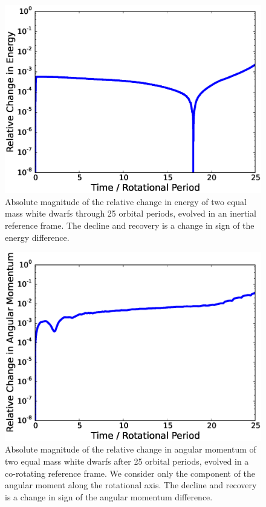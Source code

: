\documentclass[iop]{../emulateapj}
\begin{document}
\begin{figure}
  \centering
  \includegraphics[scale=0.45]{plots/equal_energy_rot0.eps}
  \caption{Absolute magnitude of the relative change in energy of two equal mass white dwarfs through 25 orbital periods,
           evolved in an inertial reference frame. The decline and recovery is a change in sign of the energy difference.
           \label{fig:energy_conservation_equal}}
\end{figure}

\begin{figure}
  \centering
  \includegraphics[scale=0.45]{plots/unequal_angular_momentum_rot1.eps}
  \caption{Absolute magnitude of the relative change in angular momentum of two equal mass white dwarfs after 25 orbital periods, 
           evolved in a co-rotating reference frame. We consider only the component of the angular moment along the rotational 
           axis. The decline and recovery is a change in sign of the angular momentum difference.
           \label{fig:angular_momentum_conservation_unequal}}
\end{figure}
\end{document}
